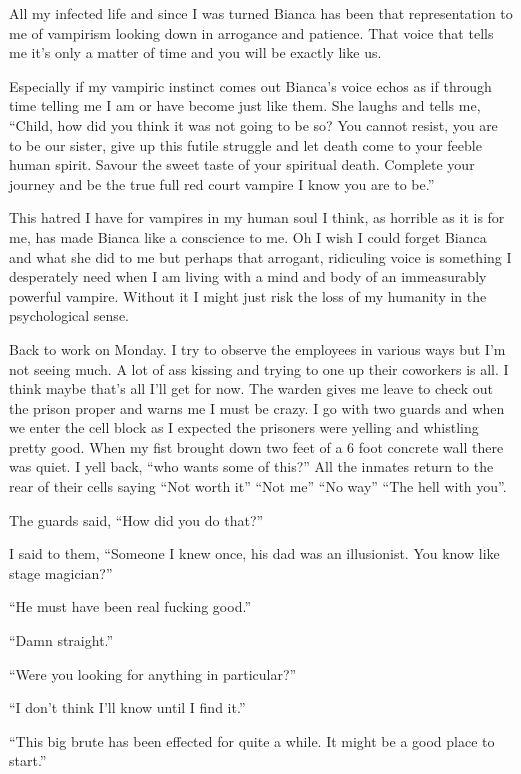 All my infected life and since I was turned Bianca has been that representation to me of vampirism looking down in arrogance and patience. That voice that tells me it's only a matter of time and you will be exactly like us. 

Especially if my vampiric instinct comes out Bianca's voice echos as if through time telling me I am or have become just like them. She laughs and tells me, ``Child, how did you think it was not going to be so? You cannot resist, you are to be our sister, give up this futile struggle and let death come to your feeble human spirit. Savour the sweet taste of your spiritual death. Complete your journey and be the true full red court vampire I know you are to be.''

This hatred I have for vampires in my human soul I think, as horrible as it is for me, has made Bianca like a conscience to me. Oh I wish I could forget Bianca and what she did to me but perhaps that arrogant, ridiculing voice is something I desperately need when I am living with a mind and body of an immeasurably powerful vampire. Without it I might just risk the loss of my humanity in the psychological sense.

Back to work on Monday. I try to observe the employees in various ways but I'm not seeing much. A lot of ass kissing and trying to one up their coworkers is all. I think maybe that's all I'll get for now. The warden gives me leave to check out the prison proper and warns me I must be crazy. I go with two guards and when we enter the cell block as I expected the prisoners were yelling and whistling pretty good. When my fist brought down two feet of a 6 foot concrete wall there was quiet. I yell back, ``who wants some of this?'' All the inmates return to the rear of their cells saying ``Not worth it'' ``Not me'' ``No way'' ``The hell with you''. 

The guards said, ``How did you do that?'' 

I said to them, ``Someone I knew once, his dad was an illusionist. You know like stage magician?''

``He must have been real fucking good.''

``Damn straight.''

``Were you looking for anything in particular?''

``I don't think I'll know until I find it.''

``This big brute has been effected for quite a while. It might be a good place to start.''

